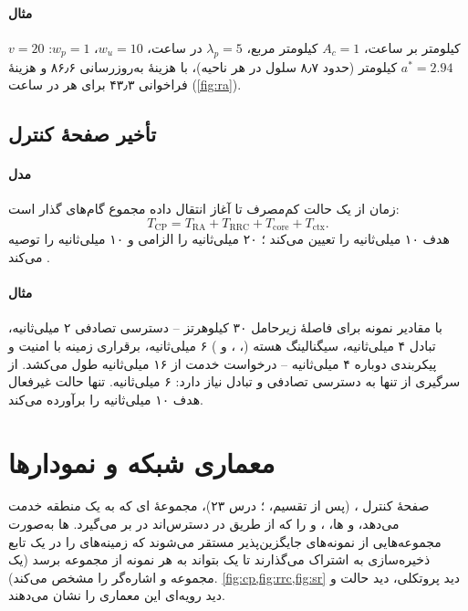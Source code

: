 \documentclass[11pt,a4paper]{article}
\begin{document}
\paragraph{مثال} $v = 20$ کیلومتر بر ساعت، $A_c = 1$ کیلومتر مربع، $\lambda_p = 5$ در ساعت، $w_u = 10$، $w_p = 1$: $a^{*} = 2.94$ کیلومتر (حدود ۸٫۷ سلول در هر
ناحیه)، با هزینهٔ به‌روزرسانی ۸۶٫۶ و هزینهٔ فراخوانی ۴۳٫۳ برای هر  در ساعت (\cref{fig:ra}).

\begin{acnfigure}
  \caption{معاوضهٔ اندازهٔ ناحیهٔ ثبت (\cref{eq:racost,eq:raopt}).}
  \label{fig:ra}
\end{acnfigure}

\subsection{تأخیر صفحهٔ کنترل}\label{sec:cplat}
\paragraph{مدل} زمان از یک حالت کم‌مصرف تا آغاز انتقال داده مجموع گام‌های گذار است:
\begin{equation}\label{eq:cplat}
  T_{\mathrm{CP}} = T_{\mathrm{RA}} + T_{\mathrm{RRC}} + T_{\mathrm{core}} + T_{\mathrm{ctx}} .
\end{equation}
 هدف ۱۰ میلی‌ثانیه را تعیین می‌کند \cite{tr38913}؛  ۲۰ میلی‌ثانیه را الزامی و ۱۰ میلی‌ثانیه را توصیه می‌کند \cite{itu2017m2410}.
\paragraph{مثال} با مقادیر نمونه برای فاصلهٔ زیرحامل ۳۰ کیلوهرتز -- دسترسی تصادفی ۲ میلی‌ثانیه، تبادل  ۴ میلی‌ثانیه، سیگنالینگ هسته
(، ،  و ) ۶ میلی‌ثانیه، برقراری زمینه با امنیت  و پیکربندی دوباره ۴ میلی‌ثانیه -- درخواست خدمت از
 ۱۶ میلی‌ثانیه طول می‌کشد. از سرگیری از  تنها به دسترسی تصادفی و تبادل  نیاز دارد: ۶ میلی‌ثانیه. تنها
حالت غیرفعال هدف ۱۰ میلی‌ثانیه را برآورده می‌کند.

\section{معماری شبکه و نمودارها}
صفحهٔ کنترل ،  (پس از تقسیم، ؛ درس ۲۳)، مجموعهٔ ای که به یک منطقه خدمت می‌دهد، و ها، ،
 و  را که از طریق  در دسترس‌اند در بر می‌گیرد. ها به‌صورت مجموعه‌هایی از نمونه‌های جایگزین‌پذیر مستقر
می‌شوند که زمینه‌های  را در یک تابع ذخیره‌سازی به اشتراک می‌گذارند تا یک  بتواند به هر نمونه از مجموعه برسد (یک 
مجموعه و اشاره‌گر را مشخص می‌کند). \cref{fig:cp,fig:rrc,fig:sr} دید پروتکلی، دید حالت و دید رویه‌ای این معماری را نشان می‌دهند.
\end{document}
